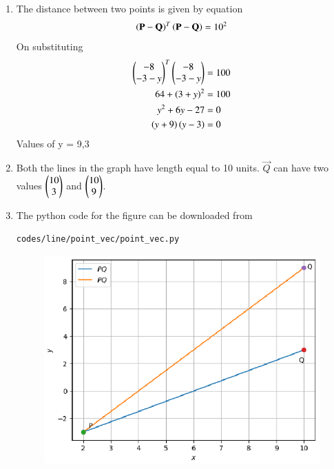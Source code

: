 \renewcommand{\theequation}{\theenumi}
\begin{enumerate}[label=\arabic*.,ref=\thesubsubsection.\theenumi]

 \item The distance between two points is given by equation
 \begin{align}
 \left(\mathbf{P}-\mathbf{Q}\right)^T\left(\mathbf{P}-\mathbf{Q}\right)=10^2
 \end{align}
 On substituting 
 \begin{align}
 \begin{pmatrix}-8\\-3-y\end{pmatrix}^T\begin{pmatrix}-8\\-3-y\end{pmatrix} &= 100 \\
 64 + \left(3+y\right)^2 &= 100\\
 y^2 + 6y -27 &= 0\\
 \left(y+9\right)\left(y-3\right) &= 0
 \end{align}
 Values of y = 9,3

\item Both the lines in the graph have length equal to 10 units. $ \vec{Q}$ can have two values $ \begin{pmatrix}10 \\3\end{pmatrix}$ and $ \begin{pmatrix}10 \\9\end{pmatrix}$.
\item The python code for the figure can be downloaded from
\begin{lstlisting}
codes/line/point_vec/point_vec.py
\end{lstlisting}

\begin{figure}[!ht]
\centering
\includegraphics[width= \columnwidth]{./figs/line/point_vec/point_vec.eps}
\end{figure}
 
 \end{enumerate}